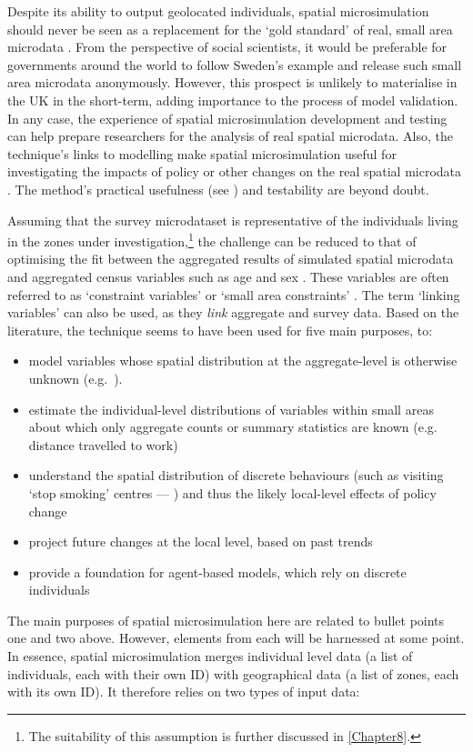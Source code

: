 Despite its ability to output geolocated individuals,
spatial microsimulation should never be seen as a
replacement for the `gold standard' of real,
small area microdata \citep[p.~4]{Martin2002}. From the perspective of social
scientists, it would be preferable for governments around the world to follow
Sweden's example and release such small area microdata anonymously. However, this
prospect is unlikely to materialise in the UK in the short-term,
adding importance to the process
of model validation. In any case, the experience of spatial microsimulation
development and testing can help prepare researchers for the analysis of real
spatial microdata. Also, the technique's links to modelling make spatial
microsimulation useful for investigating the impacts of policy or other
changes on the real spatial microdata \citep{Holm1987}.
The method's practical usefulness (see \citealp{Tomintz2008})
and testability \citep{Edwards2009} are beyond doubt.

Assuming that the survey microdataset is representative of the
individuals living in the zones under investigation,\footnote{The suitability
of this assumption is further discussed in \cref{Chapter8}.} the
challenge can be reduced to that of optimising the fit between
the aggregated results of simulated
spatial microdata and aggregated census variables such as age
and sex \citep{Williamson1998}. These variables are often
referred to as `constraint variables' or `small area constraints'
\citep{Hermes2012a}. The term `linking variables' can also be used, as they
\emph{link} aggregate and survey data.
Based on the literature, the technique seems to have been used for five main
purposes, to:
\begin{itemize}
 \item model variables whose spatial distribution at the aggregate-level is
otherwise unknown (e.g.~\citealp{Ballas1999}).
\item estimate the individual-level distributions of variables within small
areas about which only aggregate counts or summary statistics are known (e.g.
distance travelled to work)
\item understand the spatial distribution of discrete behaviours
(such as visiting `stop smoking' centres --- \citealp{Tomintz2008})
and thus the likely local-level effects of policy change \citep{Ballas2001}
\item project future changes at the local level, based on past trends
\citep{Ballas2005}
\item provide a foundation for agent-based models, which rely on
discrete individuals \citep{Ballas2007simb, Pritchard2012, Wu2010}
\end{itemize}
The main purposes of spatial microsimulation here are
related to bullet points one
and two above. However, elements from each will be harnessed at some
point.
In essence, spatial microsimulation merges individual level data (a list
of individuals, each with their own ID) with geographical data (a list of
zones, each with its own ID). It therefore relies on two types of input data:

